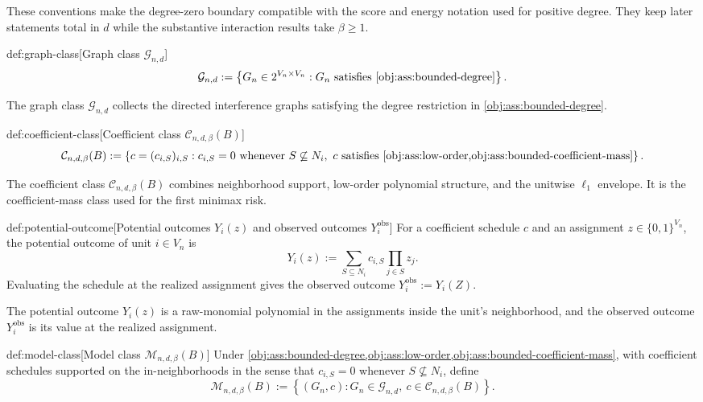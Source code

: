 \documentclass[11pt]{article}
\begin{document}
These conventions make the degree-zero boundary compatible with the score and energy notation used for positive degree. They keep later statements total in \(d\) while the substantive interaction results take \(\beta\ge1\).

\begin{definitionv}{def:graph-class}[Graph class $\mathcal G_{n,d}$]
\[
\mathcal G_{n,d}
:=
\left\{
G_n\in 2^{V_n\times V_n}:
G_n \text{ satisfies } \cref{obj:ass:bounded-degree}
\right\}.
\]
\end{definitionv}

The graph class \(\mathcal G_{n,d}\) collects the directed interference graphs satisfying the degree restriction in \cref{obj:ass:bounded-degree}.

\begin{definitionv}{def:coefficient-class}[Coefficient class $\mathcal C_{n,d,\beta}(B)$]
\[
\mathcal C_{n,d,\beta}(B)
:=
\left\{
c=(c_{i,S})_{i,S}:
c_{i,S}=0 \text{ whenever } S\not\subseteq N_i,
\ c \text{ satisfies } \cref{obj:ass:low-order,obj:ass:bounded-coefficient-mass}
\right\}.
\]
\end{definitionv}

The coefficient class \(\mathcal C_{n,d,\beta}(B)\) combines neighborhood support, low-order polynomial structure, and the unitwise \(\ell_1\) envelope. It is the coefficient-mass class used for the first minimax risk.

\begin{definitionv}{def:potential-outcome}[Potential outcomes $Y_i(z)$ and observed outcomes $Y_i^{\mathrm{obs}}$]
For a coefficient schedule \(c\) and an assignment \(z\in\{0,1\}^{V_n}\), the potential outcome of unit \(i\in V_n\) is
\[
Y_i(z)
:=
\sum_{S\subseteq N_i} c_{i,S}\prod_{j\in S} z_j .
\]
Evaluating the schedule at the realized assignment gives the observed outcome \(Y_i^{\mathrm{obs}}:=Y_i(Z)\).
\end{definitionv}

The potential outcome \(Y_i(z)\) is a raw-monomial polynomial in the assignments inside the unit's neighborhood, and the observed outcome \(Y_i^{\mathrm{obs}}\) is its value at the realized assignment.

\begin{definitionv}{def:model-class}[Model class \(\mathcal M_{n,d,\beta}(B)\)]
Under \cref{obj:ass:bounded-degree,obj:ass:low-order,obj:ass:bounded-coefficient-mass}, with coefficient schedules supported on the in-neighborhoods in the sense that \(c_{i,S}=0\) whenever \(S\not\subseteq N_i\), define
\[
\mathcal M_{n,d,\beta}(B)
:=
\left\{
(G_n,c):
G_n\in\mathcal G_{n,d},\ 
c\in\mathcal C_{n,d,\beta}(B)
\right\}.
\]
\end{definitionv}
\end{document}
